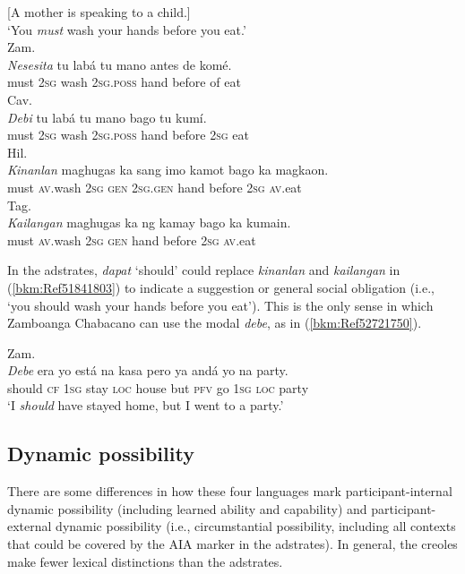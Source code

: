 \documentclass[output=paper,colorlinks,citecolor=brown]{langscibook}
\begin{document}
\ea
{\label{bkm:Ref51841803}[A mother is speaking to a child.]}\\
{‘You \textit{must} wash your hands before you eat.’}\\
\ea
{Zam.}\\
\gll \textit{Nesesita} tu labá tu mano antes de komé.\\
     must 2\textsc{sg} wash 2\textsc{sg}.\textsc{poss} hand before of eat\\
\ex
{Cav.}\\
\gll \textit{Debi} tu labá tu mano bago tu kumí.\\
     must 2\textsc{sg} wash 2\textsc{sg}.\textsc{poss} hand before 2\textsc{sg} eat\\
\ex
{Hil.}\\
\gll \textit{Kinanlan} maghugas ka sang imo kamot bago ka magkaon.\\
     must \textsc{av}.wash 2\textsc{sg} \textsc{gen} 2\textsc{sg.gen} hand before 2\textsc{sg} \textsc{av}.eat\\
\ex
{Tag.}\\
\gll \textit{Kailangan} maghugas ka ng kamay bago ka kumain.\\
     must \textsc{av}.wash 2\textsc{sg} \textsc{gen} hand before 2\textsc{sg} \textsc{av}.eat\\
\z
\z

In the adstrates, \textit{dapat} ‘should' could replace \textit{kinanlan} and \textit{kailangan} in (\ref{bkm:Ref51841803}) to indicate a suggestion or general social obligation (i.e., ‘you should wash your hands before you eat'). This is the only sense in which Zamboanga Chabacano can use the modal \textit{debe}, as in (\ref{bkm:Ref52721750}).

\ea
{\label{bkm:Ref52721750}Zam.}\\
\gll \textit{Debe} era yo está na kasa pero ya andá yo na party.\\
should \textsc{cf} 1\textsc{sg} stay \textsc{loc} house but \textsc{pfv} go 1\textsc{sg} \textsc{loc} party\\
\glt  `I \textit{should} have stayed home, but I went to a party.'\\
\z

\subsection{Dynamic possibility}

There are some differences in how these four languages mark par\-tic\-i\-pant-in\-ter\-nal dynamic possibility (including learned ability and capability) and participant-external dynamic possibility (i.e., circumstantial possibility, including all contexts that could be covered by the AIA marker in the adstrates). In general, the creoles make fewer lexical distinctions than the adstrates. 
\end{document}
